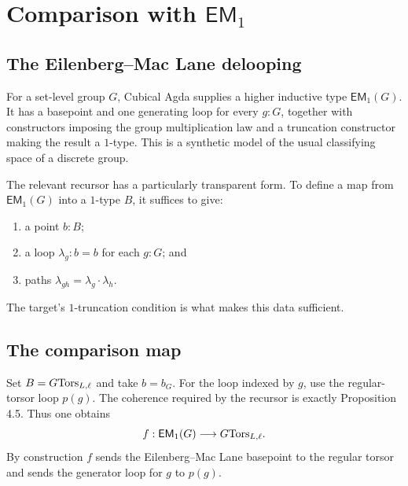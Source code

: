 \section{Comparison with \texorpdfstring{$\mathsf{EM}_1$}{EM1}}
\label{ch:em1}

\subsection{The Eilenberg--Mac Lane delooping}
For a set-level group $G$, Cubical Agda supplies a higher inductive type $\mathsf{EM}_1(G)$. It has a basepoint and one generating loop for every $g:G$, together with constructors imposing the group multiplication law and a truncation constructor making the result a $1$-type. This is a synthetic model of the usual classifying space of a discrete group.

The relevant recursor has a particularly transparent form. To define a map from $\mathsf{EM}_1(G)$ into a $1$-type $B$, it suffices to give:
\begin{enumerate}[label=\textup{(\roman*)}]
\item a point $b:B$;
\item a loop $\lambda_g:b=b$ for each $g:G$; and
\item paths $\lambda_{gh}=\lambda_g\mathbin{\cdot}\lambda_h$.
\end{enumerate}
The target's $1$-truncation condition is what makes this data sufficient.


\subsection{The comparison map}
Set $B=G\mathrm{Tors}_{L,\ell}$ and take $b=b_G$. For the loop indexed by $g$, use the regular-torsor loop $p(g)$. The coherence required by the recursor is exactly Proposition 4.5. Thus one obtains
\begin{equation}
f:\mathsf{EM}_1(G)\longrightarrow G\mathrm{Tors}_{L,\ell}.
\label{eq:em-map}
\end{equation}
By construction $f$ sends the Eilenberg--Mac Lane basepoint to the regular torsor and sends the generator loop for $g$ to $p(g)$.


